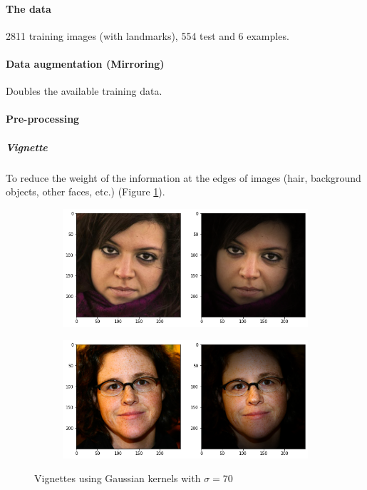 \documentclass{article}
\begin{document}
\paragraph{The data} 2811 training images (with landmarks), 554 test and 6 examples.

\paragraph{Data augmentation (Mirroring)} Doubles the available training data.

\paragraph{Pre-processing}

\subparagraph{Vignette} To reduce the weight of the information at the edges of images (hair, background objects, other faces, etc.) (Figure \ref{fig:vignette}).

\begin{figure}[h]
  \begin{subfigure}[b]{0.49\textwidth}
    \includegraphics[width=\textwidth]{vignette1}
  \end{subfigure}
  \hfill
  \begin{subfigure}[b]{0.49\textwidth}
    \includegraphics[width=\textwidth]{vignette5}
  \end{subfigure}
  \hfill
  \caption{Vignettes using Gaussian kernels with $\sigma=70$}
  \label{fig:vignette}
\end{figure}
\end{document}
